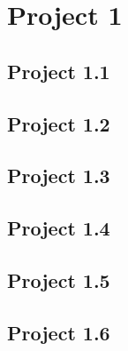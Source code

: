 \documentclass[a4paper, 12pt]{article}
\begin{document}
\setcounter{page}{1}

\section{Project 1} \label{day1}

\subsection{Project 1.1}



\subsection{Project 1.2}



\subsection{Project 1.3}



\subsection{Project 1.4}



\subsection{Project 1.5}



\subsection{Project 1.6}


\end{document}

